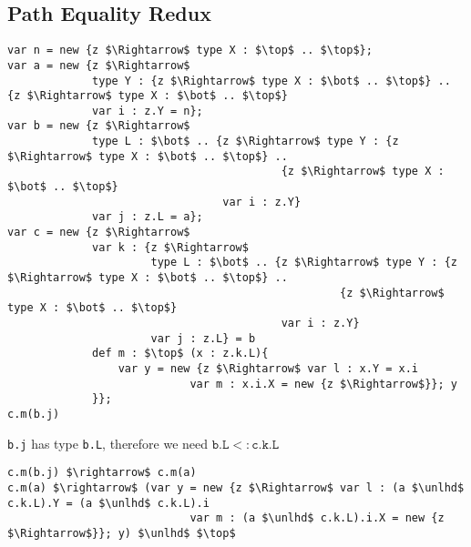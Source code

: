 \documentclass{llncs}
\begin{document}
\subsection{Path Equality Redux}
\begin{lstlisting}[mathescape, style=custom_lang]
var n = new {z $\Rightarrow$ type X : $\top$ .. $\top$};
var a = new {z $\Rightarrow$
             type Y : {z $\Rightarrow$ type X : $\bot$ .. $\top$} .. {z $\Rightarrow$ type X : $\bot$ .. $\top$}
             var i : z.Y = n};
var b = new {z $\Rightarrow$
             type L : $\bot$ .. {z $\Rightarrow$ type Y : {z $\Rightarrow$ type X : $\bot$ .. $\top$} .. 
                                          {z $\Rightarrow$ type X : $\bot$ .. $\top$}
                                 var i : z.Y}
             var j : z.L = a};
var c = new {z $\Rightarrow$
             var k : {z $\Rightarrow$
                      type L : $\bot$ .. {z $\Rightarrow$ type Y : {z $\Rightarrow$ type X : $\bot$ .. $\top$} .. 
                                                   {z $\Rightarrow$ type X : $\bot$ .. $\top$}
                                          var i : z.Y}
                      var j : z.L} = b
             def m : $\top$ (x : z.k.L){
                 var y = new {z $\Rightarrow$ var l : x.Y = x.i 
                            var m : x.i.X = new {z $\Rightarrow$}}; y
             }};
c.m(b.j)
\end{lstlisting}
\texttt{b.j} has type \texttt{b.L}, therefore we need 
$\texttt{b.L} <: \texttt{c.k.L}$
\begin{lstlisting}[mathescape, style=custom_lang]
c.m(b.j) $\rightarrow$ c.m(a)
c.m(a) $\rightarrow$ (var y = new {z $\Rightarrow$ var l : (a $\unlhd$ c.k.L).Y = (a $\unlhd$ c.k.L).i 
                            var m : (a $\unlhd$ c.k.L).i.X = new {z $\Rightarrow$}}; y) $\unlhd$ $\top$
\end{lstlisting}

\end{document}
